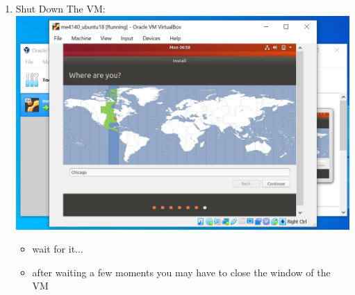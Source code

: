\documentclass[12pt]{article}
\begin{document}
\begin{description}
\begin{enumerate}
	\newpage
\item Shut Down The VM: \vspace{20mm} \\
      		\includegraphics[scale=.6]{Capture18.png}
			\begin{itemize}
                 
				 \item wait for it...
                 \item after waiting a few moments you may have to close the window of the VM
                     

\end{itemize}
\end{enumerate}
\end{description}
\end{document}
